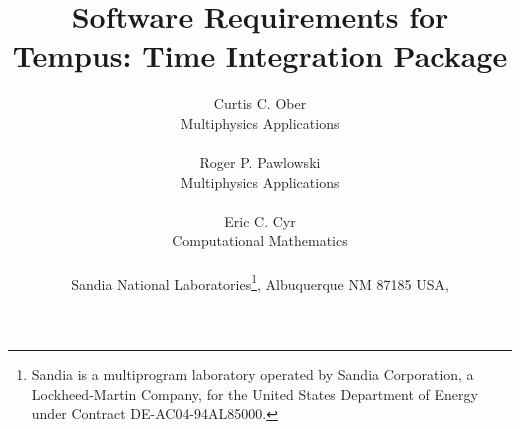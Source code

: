 \documentclass[pdf,11pt]{SANDreport}
\title{ Software Requirements for Tempus: Time Integration Package }
\author{
Curtis C. Ober \\ Multiphysics Applications \\ \\
Roger P. Pawlowski \\ Multiphysics Applications \\ \\
Eric C. Cyr \\ Computational Mathematics \\ \\
Sandia National Laboratories\footnote{
Sandia is a multiprogram laboratory operated by Sandia Corporation, a
Lockheed-Martin Company, for the United States Department of Energy
under Contract DE-AC04-94AL85000.}, Albuquerque NM 87185 USA, \\
}
\date{}
\begin{document}
\maketitle

%
\begin{abstract}
  
\end{abstract}

%
\clearpage



%
\clearpage
\tableofcontents


% 


%     


\end{document}
